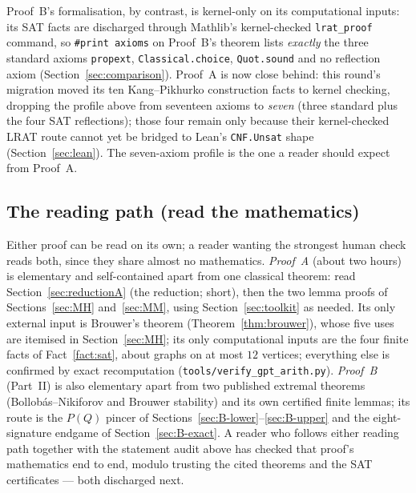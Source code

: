 \documentclass[11pt,reqno]{amsart}
\theoremstyle{definition}
\theoremstyle{remark}
\begin{document}
Proof~B's formalisation, by contrast, is kernel-only on its computational inputs: its
SAT facts are discharged through Mathlib's kernel-checked \texttt{lrat\_proof} command,
so \texttt{\#print axioms} on Proof~B's theorem lists \emph{exactly} the three standard
axioms \texttt{propext}, \texttt{Classical.choice}, \texttt{Quot.sound} and no
reflection axiom (Section~\ref{sec:comparison}). Proof~A is now close behind: this round's
migration moved its ten Kang--Pikhurko construction facts to kernel checking, dropping the
profile above from seventeen axioms to \emph{seven} (three standard plus the four SAT
reflections); those four remain only because their kernel-checked LRAT route cannot yet be
bridged to Lean's \texttt{CNF.Unsat} shape (Section~\ref{sec:lean}). The seven-axiom
profile is the one a reader should expect from Proof~A.

\subsection*{The reading path (read the mathematics)}
Either proof can be read on its own; a reader wanting the strongest human check reads
both, since they share almost no mathematics. \emph{Proof~A} (about two hours) is
elementary and self-contained apart from one classical theorem: read
Section~\ref{sec:reductionA} (the reduction; short), then the two lemma proofs of
Sections~\ref{sec:MH} and~\ref{sec:MM}, using Section~\ref{sec:toolkit} as needed. Its
only external input is Brouwer's theorem (Theorem~\ref{thm:brouwer}), whose five uses
are itemised in Section~\ref{sec:MH}; its only computational inputs are the four finite
facts of Fact~\ref{fact:sat}, about graphs on at most $12$ vertices; everything else is
confirmed by exact recomputation (\texttt{tools/verify\_gpt\_arith.py}). \emph{Proof~B}
(Part~II) is also elementary apart from two published extremal theorems
(Bollob\'as--Nikiforov and Brouwer stability) and its own certified finite lemmas; its
route is the $P(Q)$ pincer of Sections~\ref{sec:B-lower}--\ref{sec:B-upper} and the
eight-signature endgame of Section~\ref{sec:B-exact}. A reader who follows either
reading path together with the statement audit above has checked that proof's
mathematics end to end, modulo trusting the cited theorems and the SAT certificates ---
both discharged next.
\end{document}

